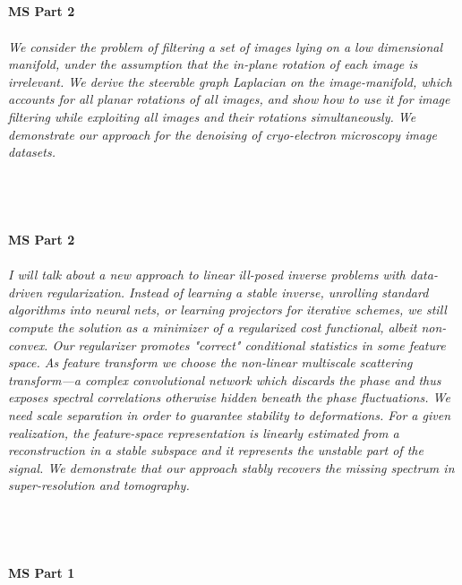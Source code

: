 \begin{multicols}{2}
\\ 
    \\
    \\\\
    \noindent\textbf{MS Part 2}\\
\\  
    \textit{We consider the problem of filtering a set of images lying on a low dimensional manifold, under the assumption that the in-plane rotation of each image is irrelevant. We derive the steerable graph Laplacian on the image-manifold, which accounts for all planar rotations of all images, and show how to use it for image filtering while exploiting all images and their rotations simultaneously. We demonstrate our approach for the denoising of cryo-electron microscopy image datasets.}\\
\\ 
    \\
    \\\\
    \noindent\textbf{MS Part 2}\\
\\  
    \textit{I will talk about a new approach to linear ill-posed inverse problems with data-driven regularization. Instead of learning a stable inverse, unrolling standard algorithms into neural nets, or learning projectors for iterative schemes, we still compute the solution as a minimizer of a regularized cost functional, albeit non-convex. Our regularizer promotes "correct" conditional statistics in some feature space. As feature transform we choose the non-linear multiscale scattering transform---a complex convolutional network which discards the phase and thus exposes spectral correlations otherwise hidden beneath the phase fluctuations. We need scale separation in order to guarantee stability to deformations. For a given realization, the feature-space representation is linearly estimated from a reconstruction in a stable subspace and it represents the unstable part of the signal. We demonstrate that our approach stably recovers the missing spectrum in super-resolution and tomography. }\\
\\ 
    \\
    \\\\
    \noindent\textbf{MS Part 1}\\
\\  

\end{multicols}
